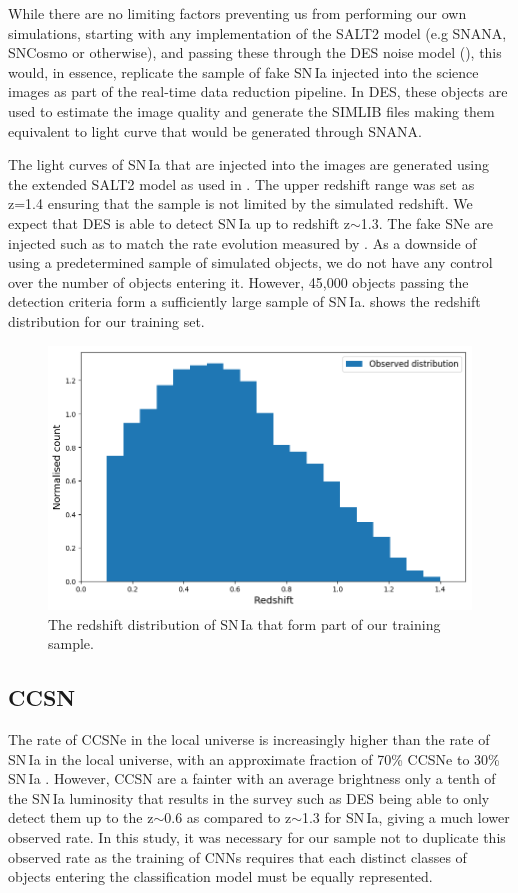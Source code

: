 While there are no limiting factors preventing us from performing our own simulations, starting with any implementation of the SALT2 model (e.g SNANA, SNCosmo or otherwise), and passing these through the DES noise model (), this would, in essence, replicate the sample of fake SN\,Ia injected into the science images as part of the real-time data reduction pipeline. In DES, these objects are used to estimate the image quality and generate the \textsc{SIMLIB} files making them equivalent to light curve that would be generated through SNANA.

The light curves of SN\,Ia that are injected into the images are generated using the extended SALT2 model as used in \citet{Betoule2014}. The upper redshift range was set as z=1.4 ensuring that the sample is not limited by the simulated redshift. We expect that DES is able to detect SN\,Ia up to redshift z$\sim$1.3. The fake SNe are injected such as to match the rate evolution measured by \citet{Perrett2012}. As a downside of using a predetermined sample of simulated objects, we do not have any control over the number of objects entering it. However, 45,000 objects passing the detection criteria form a sufficiently large sample of SN\,Ia.  shows the redshift distribution for our training set.

\begin{figure}
  \includegraphics[width=\textwidth]{Figures/Chapter5/SNIa_z_dist.png}
  \caption{The redshift distribution of SN\,Ia that form part of our training sample. }
  \label{fig:IaDist}
\end{figure}

\subsection{CCSN}
The rate of CCSNe in the local universe is increasingly higher than the rate of SN\,Ia in the local universe, with an approximate fraction of 70\% CCSNe to 30\% SN\,Ia  \citep{Alsabti2017}. However, CCSN are a fainter with an average brightness only a tenth of the SN\,Ia luminosity that results in the survey such as DES being able to only detect them up to the z$\sim$0.6 as compared to z$\sim$1.3 for SN\,Ia, giving a much lower observed rate. In this study, it was necessary for our sample not to duplicate this observed rate as the training of CNNs requires that each distinct classes of objects entering the classification model must be equally represented.

